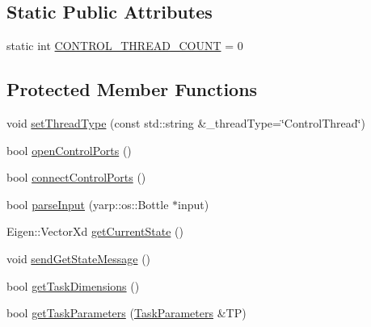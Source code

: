 \subsection*{Static Public Attributes}
\begin{DoxyCompactItemize}
\item 
static int \hyperlink{classocra__recipes_1_1ControlThread_af77b19fbb04fcf73374045928d3fef12}{C\+O\+N\+T\+R\+O\+L\+\_\+\+T\+H\+R\+E\+A\+D\+\_\+\+C\+O\+U\+NT} = 0
\end{DoxyCompactItemize}
\subsection*{Protected Member Functions}
\begin{DoxyCompactItemize}
\item 
void \hyperlink{classocra__recipes_1_1ControlThread_a62d882d2bad8a2468cbc080cad101a1f}{set\+Thread\+Type} (const std\+::string \&\+\_\+thread\+Type=\char`\"{}Control\+Thread\char`\"{})
\item 
bool \hyperlink{classocra__recipes_1_1ControlThread_af7612ae9f2da601a24df863f4ff6e2a5}{open\+Control\+Ports} ()
\item 
bool \hyperlink{classocra__recipes_1_1ControlThread_a12bc9c3976f83aaf281f31d225740bd2}{connect\+Control\+Ports} ()
\item 
bool \hyperlink{classocra__recipes_1_1ControlThread_a1e13b4ab213e0f72b65aa17095d001fb}{parse\+Input} (yarp\+::os\+::\+Bottle $\ast$input)
\item 
Eigen\+::\+Vector\+Xd \hyperlink{classocra__recipes_1_1ControlThread_abcb1ddc1f244b60899c028bb16b4cc07}{get\+Current\+State} ()
\item 
void \hyperlink{classocra__recipes_1_1ControlThread_a53191169bc860dc92314fe65bab83c97}{send\+Get\+State\+Message} ()
\item 
bool \hyperlink{classocra__recipes_1_1ControlThread_aa7f0d827de6315ad83948620efc1630e}{get\+Task\+Dimensions} ()
\item 
bool \hyperlink{classocra__recipes_1_1ControlThread_a487dd1d0b2c718ef7d8a78e638c6cefd}{get\+Task\+Parameters} (\hyperlink{classocra__recipes_1_1TaskParameters}{Task\+Parameters} \&TP)
\end{DoxyCompactItemize}
